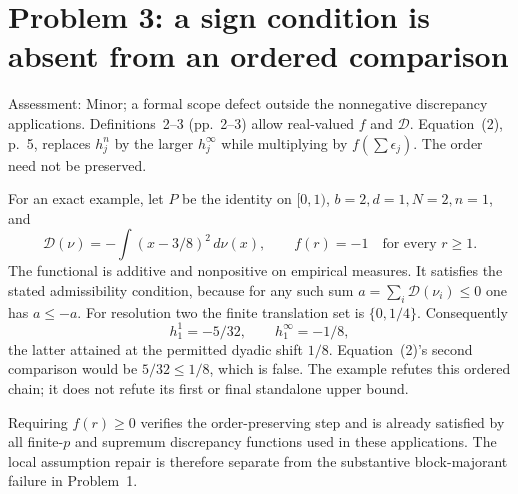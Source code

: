 \documentclass[10pt]{article}
\begin{document}
\section*{Problem 3: a sign condition is absent from an ordered comparison}
Assessment: Minor; a formal scope defect outside the nonnegative discrepancy applications. Definitions 2–3 (pp. 2–3) allow real-valued \(f\) and \(\mathcal D\). Equation (2), p. 5, replaces \(h_j^n\) by the larger \(h_j^\infty\) while multiplying by \(f(\sum\epsilon_j)\). The order need not be preserved.\par
For an exact example, let \(P\) be the identity on \([0,1)\), \(b=2,d=1,N=2,n=1\), and \[\mathcal D(\nu)=-\int(x-3/8)^2\,d\nu(x),\qquad f(r)=-1
 \quad\text{for every }r\ge1.\] The functional is additive and nonpositive on empirical measures. It satisfies the stated admissibility condition, because for any such sum \(a=\sum_i\mathcal D(\nu_i)\le0\) one has \(a\le-a\). For resolution two the finite translation set is \(\{0,1/4\}\). Consequently \[h_1^1=-5/32,\qquad h_1^\infty=-1/8,\] the latter attained at the permitted dyadic shift \(1/8\). Equation (2)’s second comparison would be \(5/32\le1/8\), which is false. The example refutes this ordered chain; it does not refute its first or final standalone upper bound.\par
Requiring \(f(r)\ge0\) verifies the order-preserving step and is already satisfied by all finite-\(p\) and supremum discrepancy functions used in these applications. The local assumption repair is therefore separate from the substantive block-majorant failure in Problem 1.\par
\end{document}
